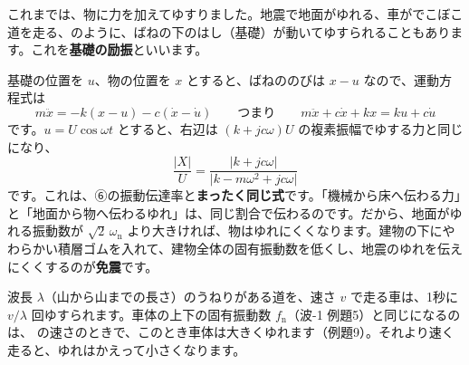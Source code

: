 \label{ph:波-2:sec9}
\noindent\begin{minipage}[c]{0.44\linewidth}\centering
{}
\end{minipage}\hfill
\begin{minipage}[c]{0.53\linewidth}\raggedright
これまでは、物に力を加えてゆすりました。地震で地面がゆれる、車がでこぼこ道を走る、のように、ばねの下のはし（基礎）が動いてゆすられることもあります。これを\textbf{基礎の励振}といいます。
\end{minipage}

\par\vspace{4pt}
基礎の位置を $u$、物の位置を $x$ とすると、ばねののびは $x-u$ なので、運動方程式は
\[m\ddot x=-k(x-u)-c(\dot x-\dot u)\qquad\text{つまり}\qquad m\ddot x+c\dot x+kx=ku+c\dot u\]
です。$u=U\cos\omega t$ とすると、右辺は $(k+jc\omega)U$ の複素振幅でゆする力と同じになり、
\[\frac{\lvert X\rvert}{U}=\frac{\lvert k+jc\omega\rvert}{\lvert k-m\omega^2+jc\omega\rvert}\]
です。これは、⑥の振動伝達率と\textbf{まったく同じ式}です。「機械から床へ伝わる力」と「地面から物へ伝わるゆれ」は、同じ割合で伝わるのです。だから、地面がゆれる振動数が $\sqrt2\,\omega_{\mathrm n}$ より大きければ、物はゆれにくくなります。建物の下にやわらかい積層ゴムを入れて、建物全体の固有振動数を低くし、地震のゆれを伝えにくくするのが\textbf{免震}です。

波長 $\lambda$（山から山までの長さ）のうねりがある道を、速さ $v$ で走る車は、1秒に $v/\lambda$ 回ゆすられます。車体の上下の固有振動数 $f_{\mathrm n}$（波-1 例題5）と同じになるのは、
の速さのときで、このとき車体は大きくゆれます（例題9）。それより速く走ると、ゆれはかえって小さくなります。

